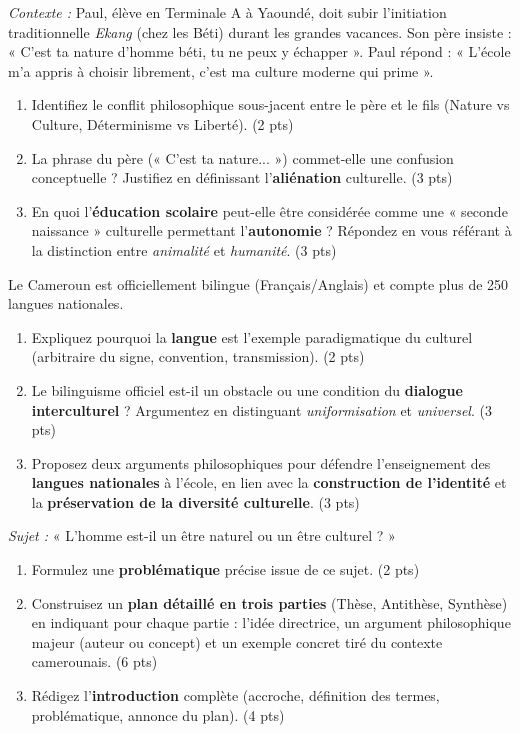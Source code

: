 \documentclass[11pt]{article}
\begin{document}
\begin{exercice}
\textit{Contexte :} Paul, élève en Terminale A à Yaoundé, doit subir l'initiation traditionnelle \textit{Ekang} (chez les Béti) durant les grandes vacances. Son père insiste : « C'est ta nature d'homme béti, tu ne peux y échapper ». Paul répond : « L'école m'a appris à choisir librement, c'est ma culture moderne qui prime ».
\begin{enumerate}
    \item Identifiez le conflit philosophique sous-jacent entre le père et le fils (Nature vs Culture, Déterminisme vs Liberté). (2 pts)
    \item La phrase du père (« C'est ta nature... ») commet-elle une confusion conceptuelle ? Justifiez en définissant l'\textbf{aliénation} culturelle. (3 pts)
    \item En quoi l'\textbf{éducation scolaire} peut-elle être considérée comme une « seconde naissance » culturelle permettant l'\textbf{autonomie} ? Répondez en vous référant à la distinction entre \textit{animalité} et \textit{humanité}. (3 pts)
\end{enumerate}
\end{exercice}

\begin{exercice}
Le Cameroun est officiellement bilingue (Français/Anglais) et compte plus de 250 langues nationales.
\begin{enumerate}
    \item Expliquez pourquoi la \textbf{langue} est l'exemple paradigmatique du culturel (arbitraire du signe, convention, transmission). (2 pts)
    \item Le bilinguisme officiel est-il un obstacle ou une condition du \textbf{dialogue interculturel} ? Argumentez en distinguant \textit{uniformisation} et \textit{universel}. (3 pts)
    \item Proposez deux arguments philosophiques pour défendre l'enseignement des \textbf{langues nationales} à l'école, en lien avec la \textbf{construction de l'identité} et la \textbf{préservation de la diversité culturelle}. (3 pts)
\end{enumerate}
\end{exercice}

\begin{exercice}
\textit{Sujet :} « L'homme est-il un être naturel ou un être culturel ? »
\begin{enumerate}
    \item Formulez une \textbf{problématique} précise issue de ce sujet. (2 pts)
    \item Construisez un \textbf{plan détaillé en trois parties} (Thèse, Antithèse, Synthèse) en indiquant pour chaque partie : l'idée directrice, un argument philosophique majeur (auteur ou concept) et un exemple concret tiré du contexte camerounais. (6 pts)
    \item Rédigez l'\textbf{introduction} complète (accroche, définition des termes, problématique, annonce du plan). (4 pts)
\end{enumerate}
\end{exercice}
\end{document}
